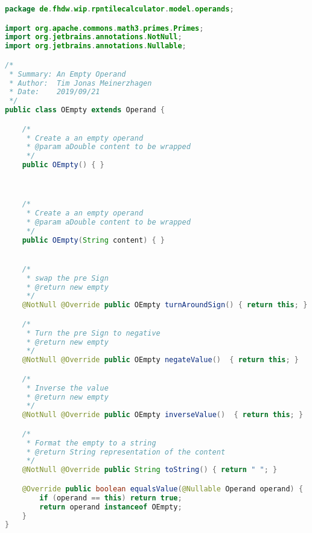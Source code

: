 \begin{lstlisting}[caption=OEmpty (Meinerzhagen),label=list:OEmpty,language=Java]
package de.fhdw.wip.rpntilecalculator.model.operands;

import org.apache.commons.math3.primes.Primes;
import org.jetbrains.annotations.NotNull;
import org.jetbrains.annotations.Nullable;

/*
 * Summary: An Empty Operand
 * Author:  Tim Jonas Meinerzhagen
 * Date:    2019/09/21
 */
public class OEmpty extends Operand {

    /*
     * Create a an empty operand
     * @param aDouble content to be wrapped
     */
    public OEmpty() { }



    /*
     * Create a an empty operand
     * @param aDouble content to be wrapped
     */
    public OEmpty(String content) { }


    /*
     * swap the pre Sign
     * @return new empty
     */
    @NotNull @Override public OEmpty turnAroundSign() { return this; }

    /*
     * Turn the pre Sign to negative
     * @return new empty
     */
    @NotNull @Override public OEmpty negateValue()  { return this; }

    /*
     * Inverse the value
     * @return new empty
     */
    @NotNull @Override public OEmpty inverseValue()  { return this; }

    /*
     * Format the empty to a string
     * @return String representation of the content
     */
    @NotNull @Override public String toString() { return " "; }

    @Override public boolean equalsValue(@Nullable Operand operand) {
        if (operand == this) return true;
        return operand instanceof OEmpty;
    }
}
\end{lstlisting}    

